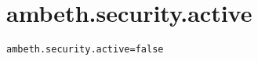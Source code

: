 \section{ambeth.security.active}
\label{configuration:AmbethSecurityActive}
\AvailableInJavaAndCsharp{\TODO}
\begin{lstlisting}[style=Props,caption={Usage example for \textit{ambeth.security.active}}]
ambeth.security.active=false
\end{lstlisting}